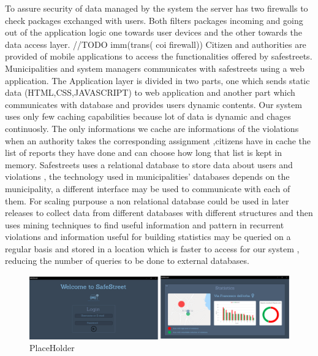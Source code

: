 To assure security of data managed by the system the server has two firewalls to check packages exchanged with users. Both filters packages incoming and going out of the application logic one towards user devices and the other towards the data access layer.
//TODO imm(trans( coi firewall))
Citizen and authorities are provided of mobile applications to access the functionalities offered by safestreets. Municipalities and system managers communicates with safestreets using a web application.
The Application layer is divided in two parts, one which sends static data (HTML,CSS,JAVASCRIPT) to web application and another part which communicates with database and provides users dynamic contents.
Our system uses only few caching capabilities because lot of data is dynamic and chages continuosly. The only informations we cache are informations of the violations when an authority takes the corresponding assignment ,citizens have in cache the list of reports they have done and can choose how long that list is kept in memory.
Safestreets uses a relational database to store data about users and violations , the technology used in municipalities' databases depends on the municipality, a different interface may be used to communicate with each of them. For scaling purpouse a non relational database could be used in later releases to collect data from different databases with different structures and then uses mining techniques to find useful information and pattern in recurrent violations and information useful for building statistics may be queried on a regular basis and stored in a location which is faster to access for our system , reducing the number of queries to be done to external databases. 

\begin{figure}[h]
\centering
\includegraphics[width=\textwidth]{Images/desktop_common_interface.png}
\caption{\label{fig:ComWI}PlaceHolder}
\end{figure}
